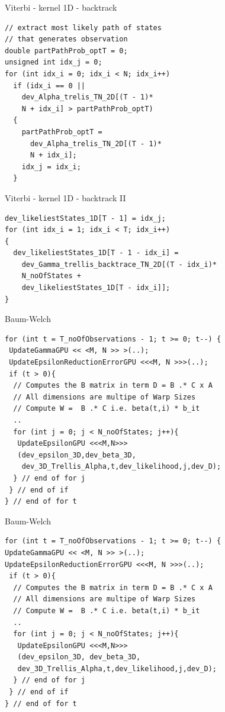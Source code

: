 \documentclass[11pt]{beamer}
\begin{document}
\begin{frame}[fragile]{Viterbi - kernel 1D - backtrack}
\begin{lstlisting}
// extract most likely path of states 
// that generates observation
double partPathProb_optT = 0;
unsigned int idx_j = 0;
for (int idx_i = 0; idx_i < N; idx_i++) 
  if (idx_i == 0 || 
    dev_Alpha_trelis_TN_2D[(T - 1)*
    N + idx_i] > partPathProb_optT)
  {
    partPathProb_optT = 
      dev_Alpha_trelis_TN_2D[(T - 1)*
      N + idx_i];
    idx_j = idx_i;
  }

\end{lstlisting}
\end{frame}

\begin{frame}[fragile]{Viterbi - kernel 1D - backtrack II}
\begin{lstlisting}
dev_likeliestStates_1D[T - 1] = idx_j;
for (int idx_i = 1; idx_i < T; idx_i++)
{
  dev_likeliestStates_1D[T - 1 - idx_i] =
    dev_Gamma_trellis_backtrace_TN_2D[(T - idx_i)*
    N_noOfStates +
    dev_likeliestStates_1D[T - idx_i]];
}
\end{lstlisting}
\end{frame}

\begin{frame}[fragile]{Baum-Welch}
\begin{lstlisting}
for (int t = T_noOfObservations - 1; t >= 0; t--) {
 UpdateGammaGPU << <M, N >> >(..);
 UpdateEpsilonReductionErrorGPU <<<M, N >>>(..);
 if (t > 0){
  // Computes the B matrix in term D = B .* C x A
  // All dimensions are multipe of Warp Sizes
  // Compute W =  B .* C i.e. beta(t,i) * b_it
  ..
  for (int j = 0; j < N_noOfStates; j++){
   UpdateEpsilonGPU <<<M,N>>>
   (dev_epsilon_3D,dev_beta_3D,
    dev_3D_Trellis_Alpha,t,dev_likelihood,j,dev_D);
  } // end of for j
 } // end of if
} // end of for t
\end{lstlisting}
\end{frame}

\begin{frame}[fragile]{Baum-Welch}
\begin{lstlisting}
for (int t = T_noOfObservations - 1; t >= 0; t--) {
UpdateGammaGPU << <M, N >> >(..);
UpdateEpsilonReductionErrorGPU <<<M, N >>>(..);
 if (t > 0){
  // Computes the B matrix in term D = B .* C x A
  // All dimensions are multipe of Warp Sizes
  // Compute W =  B .* C i.e. beta(t,i) * b_it
  ..
  for (int j = 0; j < N_noOfStates; j++){
   UpdateEpsilonGPU <<<M,N>>>
   (dev_epsilon_3D, dev_beta_3D,
   dev_3D_Trellis_Alpha,t,dev_likelihood,j,dev_D);
  } // end of for j
 } // end of if
} // end of for t
\end{lstlisting}
\end{frame}
\end{document}
